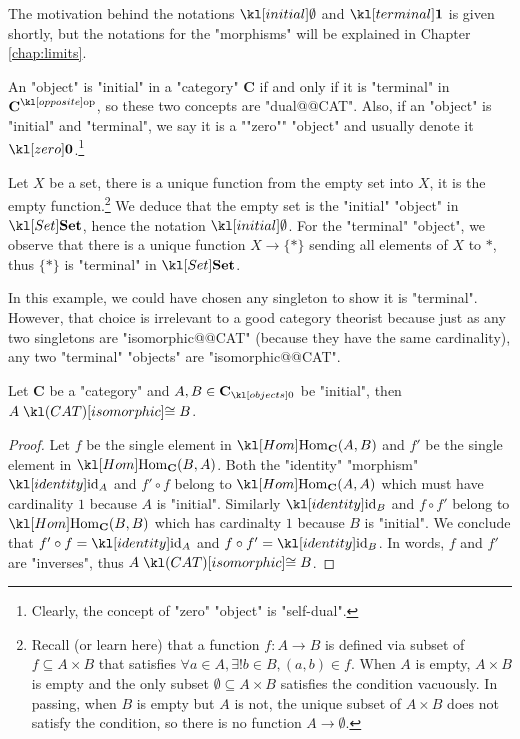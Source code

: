 \documentclass[main.tex]{subfiles}
\begin{document}
\begin{rem}[Notation]
	The motivation behind the notations $\initial$ and $\terminal$ is given shortly, but the notations for the "morphisms" will be explained in Chapter \ref{chap:limits}.
\end{rem}
An "object" is "initial" in a "category" $\mathbf{C}$ if and only if it is "terminal" in $\op{\mathbf{C}}$, so these two concepts are "dual@@CAT". \AP Also, if an "object" is "initial" and "terminal", we say it is a ""zero"" "object" and usually denote it $\zero$.\footnote{Clearly, the concept of "zero" "object" is "self-dual".}
\begin{exmp}[$\catSet$]
	Let $X$ be a set, there is a unique function from the empty set into $X$, it is the empty function.\footnote{Recall (or learn here) that a function $f: A \rightarrow B$ is defined via subset of $f \subseteq A \times B$ that satisfies $\forall a \in A, \exists! b\in B, (a,b) \in f$. When $A$ is empty, $A \times B$ is empty and the only subset $\emptyset \subseteq A\times B$ satisfies the condition vacuously. In passing, when $B$ is empty but $A$ is not, the unique subset of $A \times B$ does not satisfy the condition, so there is no function $A \rightarrow \emptyset$.} We deduce that the empty set is the "initial" "object" in $\catSet$, hence the notation $\initial$. For the "terminal" "object", we observe that there is a unique function $X \rightarrow \{\ast\}$ sending all elements of $X$ to $\ast$, thus $\{\ast\}$ is "terminal" in $\catSet$.
\end{exmp}
In this example, we could have chosen any singleton to show it is "terminal". However, that choice is irrelevant to a good category theorist because just as any two singletons are "isomorphic@@CAT" (because they have the same cardinality), any two "terminal" "objects" are "isomorphic@@CAT".
\begin{prop}\label{prop:initialunique}
	Let $\mathbf{C}$ be a "category" and $A,B\in \obj{\mathbf{C}}$ be "initial", then $A \isoCAT B$.
\end{prop}
\begin{proof}
	Let $f$ be the single element in $\Hom_{\mathbf{C}}(A,B)$ and $f'$ be the single element in $\Hom_{\mathbf{C}}(B,A)$. Both the "identity" "morphism" $\id_A$ and $f' \circ f$ belong to $\Hom_{\mathbf{C}}(A,A)$ which must have cardinality $1$ because $A$ is "initial". Similarly $\id_B$ and $f \circ f'$ belong to $\Hom_{\mathbf{C}}(B,B)$ which has cardinalty $1$ because $B$ is "initial". We conclude that $f' \circ f = \id_A$ and $f\circ f' = \id_B$. In words, $f$ and $f'$ are "inverses", thus $A \isoCAT B$. 
\end{proof}
\end{document}
